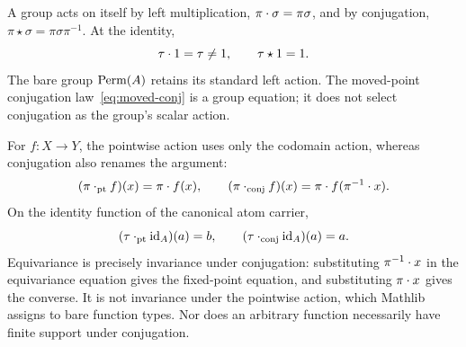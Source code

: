 \begin{example}
\label{ex:group-actions}
A group acts on itself by left multiplication, $\pi\mathbin{\cdot}\sigma=\pi\sigma$,
and by conjugation, $\pi\star\sigma=\pi\sigma\pi^{-1}$. At the identity,
\[
  \tau\mathbin{\cdot}1=\tau\ne1,\qquad \tau\star1=1.
\]
The bare group $\operatorname{Perm}(A)$ retains its standard left action. The moved-point
conjugation law~\eqref{eq:moved-conj} is a group equation; it does not select
conjugation as the group's scalar action.
\end{example}

\begin{example}
\label{ex:function-actions}
For $f:X\to Y$, the pointwise action uses only the codomain action,
whereas conjugation also renames the argument:
\[
  (\pi\mathbin{\cdot}_{\mathrm{pt}}f)(x)=\pi\mathbin{\cdot} f(x),\qquad
  (\pi\mathbin{\cdot}_{\mathrm{conj}}f)(x)=\pi\mathbin{\cdot} f(\pi^{-1}\mathbin{\cdot} x).
\]
On the identity function of the canonical atom carrier,
\[
  (\tau\mathbin{\cdot}_{\mathrm{pt}}\operatorname{id}_A)(a)=b,\qquad
  (\tau\mathbin{\cdot}_{\mathrm{conj}}\operatorname{id}_A)(a)=a.
\]
Equivariance is precisely invariance under conjugation: substituting
$\pi^{-1}\mathbin{\cdot} x$ in the equivariance equation gives the fixed-point
equation, and substituting $\pi\mathbin{\cdot} x$ gives the converse. It is not
invariance under the pointwise action, which Mathlib assigns to bare
function types. Nor does an arbitrary function necessarily have finite
support under conjugation.
\end{example}
